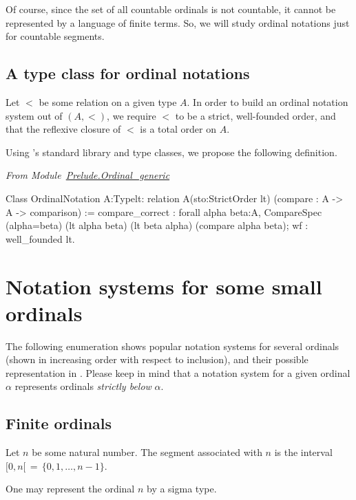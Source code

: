 Of course, since the set of all countable ordinals is not countable, it cannot be represented by a language of finite terms. So, we will study ordinal notations just  for countable segments.

\subsection{A type class for ordinal notations}

Let $<$ be some relation on a given type $A$. In order to build an ordinal  notation 
system out of $(A,<)$, we require $<$ to be a strict, well-founded order, and that 
the reflexive closure of $<$ is a total order on $A$.


Using \coq's standard library and type classes, we propose the following definition.

\vspace{4pt}
\noindent\emph{From Module~\href{../src/html/hydras.Prelude.Ordinal_generic.html}{Prelude.Ordinal\_generic}}

\begin{Coqsrc}
Class OrdinalNotation {A:Type}{lt: relation A}(sto:StrictOrder lt)
      (compare : A -> A -> comparison) :=
  { compare_correct :
      forall alpha beta:A,
        CompareSpec (alpha=beta) (lt alpha beta) (lt beta alpha)
                                 (compare alpha beta);
    wf : well_founded lt}.  
\end{Coqsrc}




\section{Notation systems for some small ordinals}

The following enumeration  shows  popular notation systems for several ordinals (shown in increasing order with respect to inclusion), and their possible representation in \coq{}.
Please keep in mind that a notation system for a given ordinal $\alpha$ represents 
ordinals \emph{strictly below} $\alpha$.

\subsection{Finite ordinals}
Let $n$ be some natural number. The segment associated with $n$ is the interval 
$[0,n[\,=\,\{0,1,\dots,n-1\}$. 

One may represent the ordinal $n$ by a sigma type.


